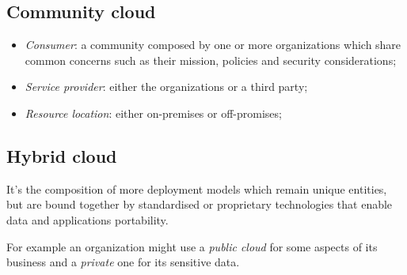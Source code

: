 \subsection{Community cloud}
\begin{itemize}
    \item \emph{Consumer}: a community composed by one or more organizations
    which share common concerns such as their mission, policies and security
    considerations;
    \item \emph{Service provider}: either the organizations or a third party;
    \item \emph{Resource location}: either on-premises or off-promises;
\end{itemize}

\subsection{Hybrid cloud}
It's the composition of more deployment models which remain unique
entities, but are bound together by standardised or proprietary technologies
that enable data and applications portability.

For example an organization might use a \emph{public cloud} for some aspects
of its business and a \emph{private} one for its sensitive data.